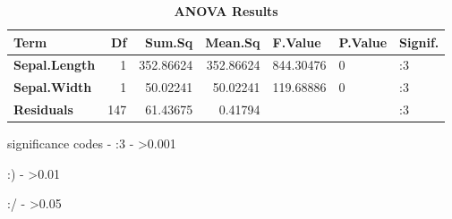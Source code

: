 \documentclass{article}
\begin{document}
\pagestyle{empty}

\begin{table}[H]
\centering
\caption{\label{tab:unnamed-chunk-6}\textbf{ANOVA Results}}
\centering
\begin{threeparttable}
\begin{tabular}[t]{|>{}l|r|r|r|l|l|>{}l|}
\hline
\textbf{Term} & \textbf{Df} & \textbf{Sum.Sq} & \textbf{Mean.Sq} & \textbf{F.Value} & \textbf{P.Value} & \textbf{Signif.}\\
\hline
\textbf{Sepal.Length} & 1 & 352.86624 & 352.86624 & 844.30476 & 0 & :3\\
\hline
\textbf{Sepal.Width} & 1 & 50.02241 & 50.02241 & 119.68886 & 0 & :3\\
\hline
\textbf{Residuals} & 147 & 61.43675 & 0.41794 &  &  & :3\\
\hline
\end{tabular}
\begin{tablenotes}[para]
\item 
\item 
\item 
\item significance codes -  :3 -  >0.001 
\item :) - >0.01
\item :/ - >0.05 
\item 
\end{tablenotes}
\end{threeparttable}
\end{table}
\end{document}
